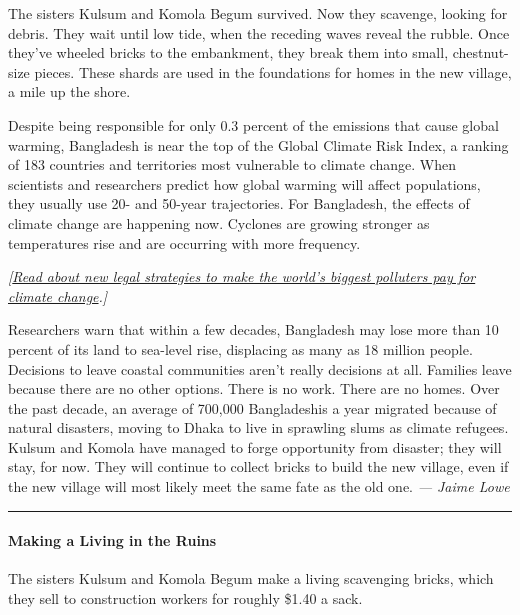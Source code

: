 The sisters Kulsum and Komola Begum survived. Now they scavenge, looking
for debris. They wait until low tide, when the receding waves reveal the
rubble. Once they've wheeled bricks to the embankment, they break them
into small, chestnut-size pieces. These shards are used in the
foundations for homes in the new village, a mile up the shore.

Despite being responsible for only 0.3 percent of the emissions that
cause global warming, Bangladesh is near the top of the Global Climate
Risk Index, a ranking of 183 countries and territories most vulnerable
to climate change. When scientists and researchers predict how global
warming will affect populations, they usually use 20- and 50-year
trajectories. For Bangladesh, the effects of climate change are
happening now. Cyclones are growing stronger as temperatures rise and
are occurring with more frequency.

\emph{{[}\href{https://www.nytimes3xbfgragh.onion/interactive/2019/04/09/magazine/climate-change-peru-law.html}{Read
about new legal strategies to make the world's biggest polluters pay for
climate change}.{]}}

Researchers warn that within a few decades, Bangladesh may lose more
than 10 percent of its land to sea-level rise, displacing as many as 18
million people. Decisions to leave coastal communities aren't really
decisions at all. Families leave because there are no other options.
There is no work. There are no homes. Over the past decade, an average
of 700,000 Bangladeshis a year migrated because of natural disasters,
moving to Dhaka to live in sprawling slums as climate refugees. Kulsum
and Komola have managed to forge opportunity from disaster; they will
stay, for now. They will continue to collect bricks to build the new
village, even if the new village will most likely meet the same fate as
the old one. \emph{--- Jaime Lowe}

\begin{center}\rule{0.5\linewidth}{\linethickness}\end{center}

\hypertarget{making-a-living-in-the-ruins}{%
\paragraph{Making a Living in the
Ruins}\label{making-a-living-in-the-ruins}}

The sisters Kulsum and Komola Begum make a living scavenging bricks,
which they sell to construction workers for roughly \$1.40 a sack.

